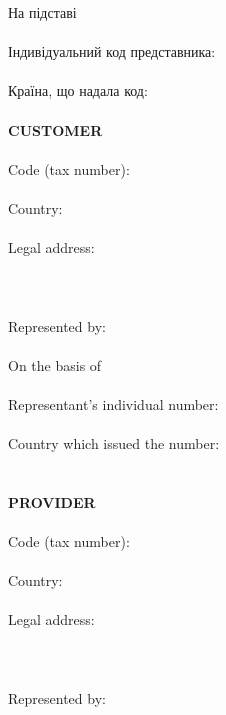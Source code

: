 \begin{Form}
\begin{paracol}{3}
{        На підставі\\
        \\
        Індивідуальний код представника:\\
        \\
        Країна, що надала код:\\
        \\
        }
        {\textbf{CUSTOMER}\\
        \\
        Code (tax number):\\
        \\
        Country:\\
        \\
        Legal address:\\
        \\
        \\
        \\
        Represented by:\\
        \\
        On the basis of\\
        \\
        Representant's individual number:\\
        \\
        Country which issued the number:\\
        \\
        \\
        \textbf{PROVIDER}\\
        \\
        Code (tax number):\\
        \\
        Country:\\
        \\
        Legal address:\\
        \\
        \\
        \\
        Represented by:\\
}
\end{paracol}
\end{Form}
